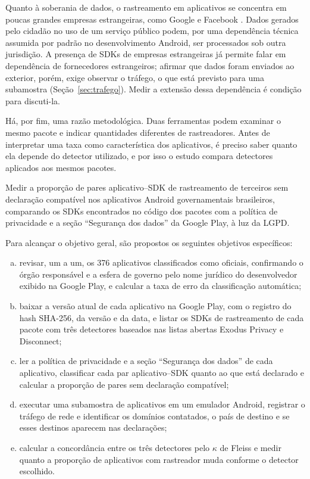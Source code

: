 Quanto à soberania de dados, o rastreamento em aplicativos se concentra em poucas grandes empresas estrangeiras, como Google e Facebook \cite{binns2018,kollnig2021before}. Dados gerados pelo cidadão no uso de um serviço público podem, por uma dependência técnica assumida por padrão no desenvolvimento Android, ser processados sob outra jurisdição. A presença de SDKs de empresas estrangeiras já permite falar em dependência de fornecedores estrangeiros; afirmar que dados foram enviados ao exterior, porém, exige observar o tráfego, o que está previsto para uma subamostra (Seção~\ref{sec:trafego}). Medir a extensão dessa dependência é condição para discuti-la.

Há, por fim, uma razão metodológica. Duas ferramentas podem examinar o mesmo pacote e indicar quantidades diferentes de rastreadores. Antes de interpretar uma taxa como característica dos aplicativos, é preciso saber quanto ela depende do detector utilizado, e por isso o estudo compara detectores aplicados aos mesmos pacotes.

\label{sec:objetivos}

\label{sec:objetivo-geral}

Medir a proporção de pares aplicativo--SDK de rastreamento de terceiros sem declaração compatível nos aplicativos Android governamentais brasileiros, comparando os SDKs encontrados no código dos pacotes com a política de privacidade e a seção ``Segurança dos dados'' da Google Play, à luz da LGPD.

\label{sec:1.4}

Para alcançar o objetivo geral, são propostos os seguintes objetivos específicos:

\begin{enumerate}[a)]
\item revisar, um a um, os 376 aplicativos classificados como oficiais, confirmando o órgão responsável e a esfera de governo pelo nome jurídico do desenvolvedor exibido na Google Play, e calcular a taxa de erro da classificação automática;
\item baixar a versão atual de cada aplicativo na Google Play, com o registro do hash SHA-256, da versão e da data, e listar os SDKs de rastreamento de cada pacote com três detectores baseados nas listas abertas Exodus Privacy e Disconnect;
\item ler a política de privacidade e a seção ``Segurança dos dados'' de cada aplicativo, classificar cada par aplicativo--SDK quanto ao que está declarado e calcular a proporção de pares sem declaração compatível;
\item executar uma subamostra de aplicativos em um emulador Android, registrar o tráfego de rede e identificar os domínios contatados, o país de destino e se esses destinos aparecem nas declarações;
\item calcular a concordância entre os três detectores pelo $\kappa$ de Fleiss e medir quanto a proporção de aplicativos com rastreador muda conforme o detector escolhido.
\end{enumerate}

